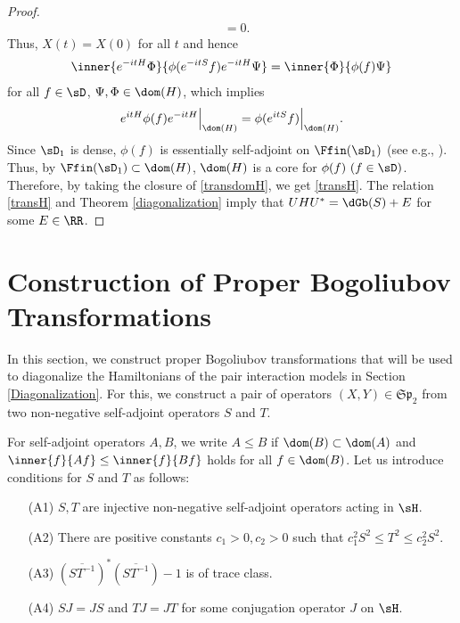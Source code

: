 \documentclass[12pt,draft]{article}
\theoremstyle{plain}
\numberwithin{equation}{section}
\theoremstyle{remark}
\begin{document}
\begin{proof}
\begin{align*}
&= 0.
\end{align*}
Thus, $X(t)=X(0)$ for all $t$ and hence
\begin{align*}
  \inner{e^{-itH}\Phi}{\phi(e^{-itS}f)e^{-itH}\Psi}
  = \inner{\Phi}{\phi(f)\Psi}
\end{align*}
for all $f\in\sD$, $\Psi,\Phi\in\dom(H)$, which implies
\begin{align}
  e^{itH} \phi(f) e^{-itH} \Big|_{\dom(H)} = \phi(e^{itS}f) \Big|_{\dom(H)}. \label{transdomH}
\end{align}
Since $\sD_1$ is dense, $\phi(f)$ is essentially self-adjoint on $\Ffin(\sD_1)$ (see e.g., \cite[Theorem 5.22]{A18}).
Thus, by $\Ffin(\sD_1)\subset \dom(H)$, $\dom(H)$ is a core for $\phi(f)~(f\in\sD)$.
Therefore, by taking the closure of \eqref{transdomH}, we get \eqref{transH}.
The relation \eqref{transH} and Theorem \ref{diagonalization} imply that 
$UHU^*=\dGb(S)+E$ for some $E\in\RR$.
\end{proof}







\section{Construction of Proper Bogoliubov Transformations}\label{construct}
In this section, we construct proper Bogoliubov transformations
that will be used to diagonalize the Hamiltonians of the pair interaction models in Section \ref{Diagonalization}.
For this, we construct a pair of operators $(X,Y) \in \mathfrak{Sp}_2$ from two non-negative self-adjoint operators $S$ and $T$.

For self-adjoint operators $A, B$, we write $A \leq B$ if $\dom(B) \subset \dom(A)$ and $\inner{f}{Af} \leq \inner{f}{Bf}$ holds for all $f \in \dom(B)$.
Let us introduce conditions for $S$ and $T$ as follows:
\begin{enumerate}
\item[(A1)] $S, T$ are injective non-negative self-adjoint operators acting in $\sH$. 
\item[(A2)] There are positive constants $c_1>0, c_2>0$ such that $c_1^2 S^2\leq T^2 \leq c_2^2S^2$. 
\item[(A3)] $\left(\overline{ST^{-1}}\right)^*\left(\overline{ST^{-1}}\right)-1$ is of trace class.
\item[(A4)] $SJ=JS$ and $TJ=JT$ for some conjugation operator $J$ on $\sH$.
\end{enumerate}
\end{document}
